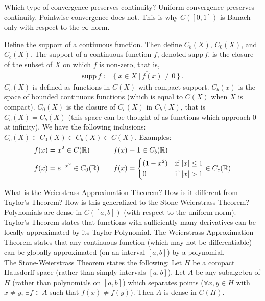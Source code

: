 \documentclass[avery5388,grid,frame]{flashcards}
\newcommand{\supp}{\mathrm{supp}\,}
\def\Rl{\mathbb{R}}
\begin{document}


\begin{flashcard}
    {Which type of convergence preserves continuity?}
    Uniform convergence preserves continuity.  Pointwise convergence does not.  This is why $C([0,1])$ is Banach only with respect to the $\infty$-norm.
\end{flashcard}

\begin{flashcard}
    {Define the support of a continuous function.  Then define $C_b(X)$, $C_0(X)$, and $C_c(X)$.}
    The support of a continuous function $f$, denoted $\supp f$, is the closure of the subset of $X$ on which $f$ is non-zero, that is,
    \begin{align*}
        \supp f \coloneqq \overline{\left\{x \in X\ |\ f(x) \neq 0\right\}}.
    \end{align*}
    $C_c(X)$ is defined as functions in $C(X)$ with compact support.  $C_b(x)$ is the space of bounded continuous functions (which is equal to $C(X)$ when $X$ is compact).  $C_0(X)$ is the closure of $C_c(X)$ in $C_b(X)$, that is $\overline{C_c(X)} = C_b(X)$ (this space can be thought of as functions which approach $0$ at infinity).  We have the following inclusions: $C_c(X) \subset C_0(X) \subset C_b(X) \subset C(X)$.  Examples:
    \begin{equation*}
        \begin{aligned}
            f(x) &= x^2 \in C(\Rl)\ \ \ \ \qquad f(x) \equiv 1 \in C_b(\Rl) \\
            f(x) &= e^{-x^2} \in C_0(\Rl) \qquad f(x) = \begin{cases}(1 - x^2) & \text{if } \abs{x} \leq 1 \\ 0 & \text{if } \abs{x} > 1 \end{cases} \in C_c(\Rl)
        \end{aligned}
    \end{equation*}
\end{flashcard}

\begin{flashcard}
    {What is the Weierstrass Approximation Theorem?  How is it different from Taylor's Theorem?  How is this generalized to the Stone-Weierstrass Theorem?}
    Polynomials are dense in $C([a,b])$ (with respect to the uniform norm). \\

    Taylor's Theorem states that functions with sufficiently many derivatives can be locally approximated by its Taylor Polynomial.  The Weierstrass Approximation Theorem states that any continuous function (which may not be differentiable) can be globally approximated (on an interval $[a,b]$) by a polynomial. \\

    The Stone-Weierstrass Theorem states the following: Let $H$ be a compact Hausdorff space (rather than simply intervals $[a,b]$).  Let $A$ be any subalgebra of $H$ (rather than polynomials on $[a,b]$) which separates points ($\forall x,y \in H$ with $x \neq y$, $\exists f \in A$ such that $f(x) \neq f(y)$).  Then $A$ is dense in $C(H)$.
\end{flashcard}
\end{document}

